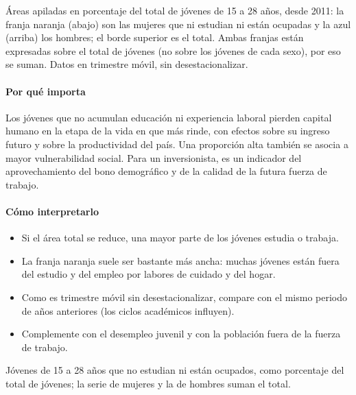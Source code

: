 \begin{leer}
Áreas apiladas en porcentaje del total de jóvenes de 15 a 28 años, desde 2011: la franja naranja (abajo) son las mujeres que ni estudian ni están ocupadas y la azul (arriba) los hombres; el borde superior es el total. Ambas franjas están expresadas sobre el total de jóvenes (no sobre los jóvenes de cada sexo), por eso se suman. Datos en trimestre móvil, sin desestacionalizar.
\end{leer}

\paragraph{Por qué importa}
Los jóvenes que no acumulan educación ni experiencia laboral pierden capital humano en la etapa de la vida en que más rinde, con efectos sobre su ingreso futuro y sobre la productividad del país. Una proporción alta también se asocia a mayor vulnerabilidad social. Para un inversionista, es un indicador del aprovechamiento del bono demográfico y de la calidad de la futura fuerza de trabajo.

\paragraph{Cómo interpretarlo}
\begin{itemize}
\item Si el área total se reduce, una mayor parte de los jóvenes estudia o trabaja.
\item La franja naranja suele ser bastante más ancha: muchas jóvenes están fuera del estudio y del empleo por labores de cuidado y del hogar.
\item Como es trimestre móvil sin desestacionalizar, compare con el mismo periodo de años anteriores (los ciclos académicos influyen).
\item Complemente con el desempleo juvenil y con la población fuera de la fuerza de trabajo.
\end{itemize}
\begin{formulas}[Fórmulas]
\end{formulas}
\begin{metodo}[Metodología]
Jóvenes de 15 a 28 años que no estudian ni están ocupados, como porcentaje del total de jóvenes; la serie de mujeres y la de hombres suman el total.
\par{}
\end{metodo}

